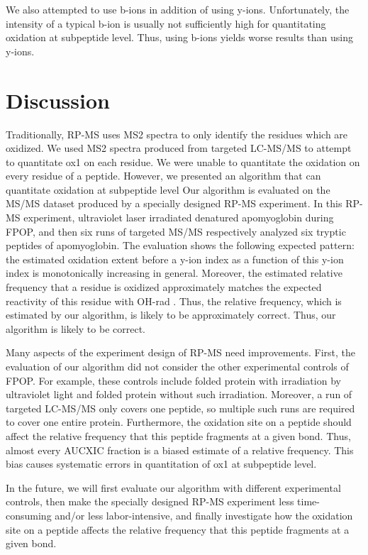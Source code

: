 We also attempted to use b-ions in addition of using y-ions.
Unfortunately, the intensity of a typical b-ion is usually not sufficiently high for quantitating oxidation at subpeptide level.
Thus, using b-ions yields worse results than using y-ions.

\section{Discussion}
\label{sec:oxlvl:discussion}
	 
Traditionally, \gls{RP-MS} uses \gls{MS2} spectra to only identify the residues which are oxidized.
We used \gls{MS2} spectra produced from targeted \gls{LC-MS/MS} to attempt to quantitate \gls{ox1} on each residue.
We were unable to quantitate the oxidation on every residue of a peptide.
However, we presented an algorithm that can quantitate oxidation at subpeptide level
Our algorithm is evaluated on the \gls{MS/MS} dataset produced by a specially designed \gls{RP-MS} experiment.
In this \gls{RP-MS} experiment, ultraviolet laser irradiated denatured apomyoglobin during \gls{FPOP},
	and then six runs of targeted \gls{MS/MS} respectively analyzed six tryptic peptides of apomyoglobin.	
The evaluation shows the following expected pattern: 
	the estimated oxidation extent before a y-ion index as a function of this y-ion index is monotonically increasing in general.
Moreover, the estimated relative frequency that a residue is oxidized approximately matches the expected reactivity of this residue with \gls{OH-rad}
		\cite{maleknia2014advances,gau2011advancement}.
Thus, the relative frequency, which is estimated by our algorithm, is likely to be approximately correct.
Thus, our algorithm is likely to be correct.

Many aspects of the experiment design of \gls{RP-MS} need improvements.
First, the evaluation of our algorithm did not consider the other experimental controls of \gls{FPOP}.
For example, these controls include folded protein with irradiation by ultraviolet light and folded protein without such irradiation.
Moreover, a run of targeted \gls{LC-MS/MS} only covers one peptide, so multiple such runs are required to cover one entire protein.
Furthermore, the oxidation site on a peptide should affect the relative frequency that this peptide fragments at a given bond.
Thus, almost every \gls{AUCXIC} fraction is a biased estimate of a relative frequency. 
This bias causes systematic errors in quantitation of \gls{ox1} at subpeptide level. 

In the future, 
	we will first evaluate our algorithm with different experimental controls,
	then make the specially designed \gls{RP-MS} experiment less time-consuming and/or less labor-intensive,
	and finally investigate how the oxidation site on a peptide affects the relative frequency that this peptide fragments at a given bond.
